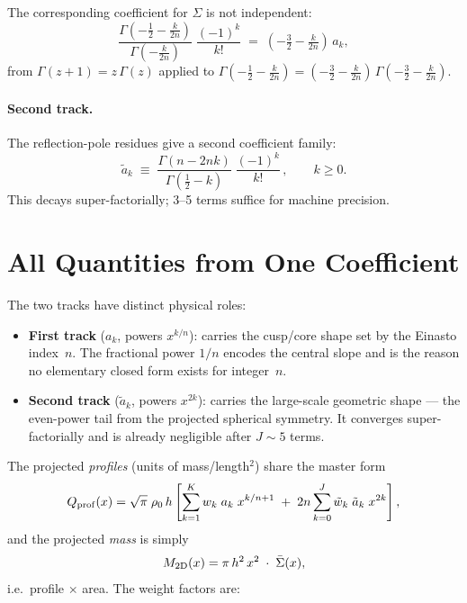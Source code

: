 \documentclass{article}
\begin{document}
The corresponding coefficient for $\Sigma$ is not independent:
\begin{equation}\label{eq:sig-coeff}
\frac{\Gamma\!\left(-\tfrac{1}{2}-\tfrac{k}{2n}\right)}
     {\Gamma\!\left(-\tfrac{k}{2n}\right)}\;
\frac{(-1)^k}{k!}
\;=\; \left(-\tfrac{3}{2}-\tfrac{k}{2n}\right)\,a_k,
\end{equation}
from $\Gamma(z+1)=z\,\Gamma(z)$ applied to
$\Gamma(-\tfrac12-\tfrac{k}{2n})=(-\tfrac32-\tfrac{k}{2n})\,
\Gamma(-\tfrac32-\tfrac{k}{2n})$.

\paragraph{Second track.}
The reflection-pole residues give a second coefficient family:
\begin{equation}\label{eq:atilde}
\tilde a_k \;\equiv\;
\frac{\Gamma(n-2nk)}{\Gamma\!\left(\tfrac{1}{2}-k\right)}\;
\frac{(-1)^k}{k!}\,,
\qquad k\ge0.
\end{equation}
This decays super-factorially; 3--5 terms suffice for machine precision.

\section{All Quantities from One Coefficient}
\label{sec:quantities}

The two tracks have distinct physical roles:
\begin{itemize}
\item \textbf{First track} ($a_k$, powers $x^{k/n}$): carries the cusp/core
  shape set by the Einasto index~$n$. The fractional power $1/n$ encodes the
  central slope and is the reason no elementary closed form exists for
  integer~$n$.
\item \textbf{Second track} ($\tilde a_k$, powers $x^{2k}$): carries the
  large-scale geometric shape --- the even-power tail from the projected
  spherical symmetry. It converges super-factorially and is already negligible
  after $J\sim5$ terms.
\end{itemize}

The projected \emph{profiles} (units of mass/length$^2$) share the master form
\begin{equation}\label{eq:master-profile}
Q_{\rm prof}(x) = \sqrt\pi\;\rho_0\,h\left[
  \sum_{k=1}^{K} w_k\; a_k\; x^{k/n+1}
  \;+\; 2n\sum_{k=0}^{J} \tilde w_k\; \tilde a_k\; x^{2k}
\right],
\end{equation}
and the projected \emph{mass} is simply
\begin{equation}\label{eq:master-mass}
M_{\rm 2D}(x) = \pi\,h^2\,x^2\;\cdot\;\bar\Sigma(x),
\end{equation}
i.e.\ profile $\times$ area.  The weight factors are:
\end{document}
